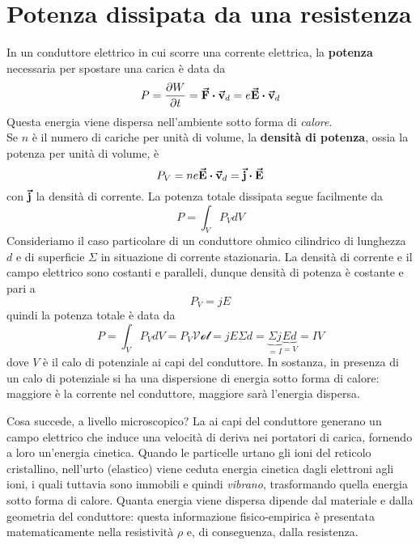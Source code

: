 \section{Potenza dissipata da una resistenza}
In un conduttore elettrico in cui scorre una corrente elettrica, la \textbf{potenza} necessaria per spostare una carica è data da
\begin{equation}
	P=\pdv{W}{t}=\vba{F}\vdot \vba{v}_d=e\vba{E}\vdot\vba{v}_d
\end{equation}
Questa energia viene dispersa nell'ambiente sotto forma di \textit{calore}.\\
Se $n$ è il numero di cariche per unità di volume, la \textbf{densità di potenza}, ossia la potenza per unità di volume, è
\begin{equation}
	P_V=ne\vba{E}\vdot\vba{v}_d=\vba{j}\vdot \vba{E}
\end{equation}
con $\vb*{\va{j}}$ la densità di corrente. La potenza totale dissipata segue facilmente da
\begin{equation}
	P=\int_{V}P_VdV
\end{equation}
Consideriamo il caso particolare di un conduttore ohmico cilindrico di lunghezza $d$ e di superficie $\Sigma$ in situazione di corrente stazionaria. La densità di corrente e il campo elettrico sono costanti e paralleli, dunque densità di potenza è costante e pari a
\begin{equation}
	P_V=jE
\end{equation}
quindi la potenza totale è data da
\begin{equation*}
	P=\int_{V}P_VdV=P_V\mathcal{Vol}=jE\Sigma d=\underbrace{\Sigma j}_{=I}\underbrace{Ed}_{=V}=IV
\end{equation*}
dove $V$ è il calo di potenziale ai capi del conduttore. In sostanza, in presenza di un calo di potenziale si ha una dispersione di energia sotto forma di calore: maggiore è la corrente nel conduttore, maggiore sarà l'energia dispersa.

Cosa succede, a livello microscopico? La \ddp ai capi del conduttore generano un campo elettrico che induce una velocità di deriva nei portatori di carica, fornendo a loro un'energia cinetica. Quando le particelle urtano gli ioni del reticolo cristallino, nell'urto (elastico) viene ceduta energia cinetica dagli elettroni agli ioni, i quali tuttavia sono immobili e quindi \textit{vibrano}, trasformando quella energia sotto forma di calore. Quanta energia viene dispersa dipende dal materiale e dalla geometria del conduttore: questa informazione fisico-empirica è presentata matematicamente nella resistività $\rho$ e, di conseguenza, dalla resistenza.

